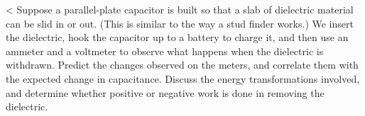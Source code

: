 %
%
<%
Suppose a parallel-plate capacitor is built so that a slab of
dielectric material can be slid in or out. (This is similar to the way a
stud finder works.) We insert the
dielectric, hook the capacitor up to a battery to charge it, and then
use an ammeter and a voltmeter to observe what happens when the
dielectric is withdrawn. Predict the changes observed on the meters,
and correlate them with the expected change in capacitance. Discuss
the energy transformations involved, and determine whether positive or
negative work is done in removing the dielectric. 
